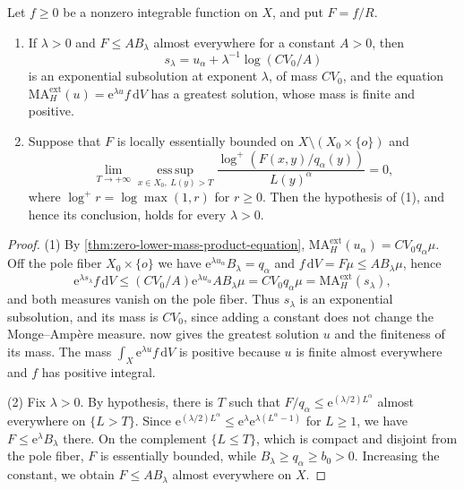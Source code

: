 \begin{theorem}\label{thm:product-zero-threshold-exponential-criterion}
Let $f\geq0$ be a nonzero integrable function on $X$, and put $F=f/R$.
\begin{enumerate}
\item If $\lambda>0$ and $F\leq AB_\lambda$ almost everywhere for a constant $A>0$, then
\[
 s_\lambda=u_\alpha+\lambda^{-1}\log(CV_0/A)
\]
is an exponential subsolution at exponent $\lambda$, of mass $CV_0$, and the equation $\mathrm{MA}^{\mathrm{ext}}_H(u)=\mathrm{e}^{\lambda u}f\,\mathrm{d}V$ has a greatest solution, whose mass is finite and positive.
\item Suppose that $F$ is locally essentially bounded on $X\setminus(X_0\times\{o\})$ and
\[
 \lim_{T\to+\infty}\operatorname*{ess\,sup}_{x\in X_0,\ L(y)>T}
 \frac{\log^+(F(x,y)/q_\alpha(y))}{L(y)^\alpha}=0,
\]
where $\log^+r=\log\max(1,r)$ for $r\geq0$.
Then the hypothesis of (1), and hence its conclusion, holds for every $\lambda>0$.
\end{enumerate}
\end{theorem}
\begin{proof}
(1) By \cref{thm:zero-lower-mass-product-equation}, $\mathrm{MA}^{\mathrm{ext}}_H(u_\alpha)=CV_0q_\alpha\mu$. Off the pole fiber $X_0\times\{o\}$ we have $\mathrm e^{\lambda u_\alpha}B_\lambda=q_\alpha$ and $f\,\mathrm{d}V=F\mu\leq AB_\lambda\mu$, hence
\[
 \mathrm e^{\lambda s_\lambda}f\,\mathrm dV
 \leq(CV_0/A)\mathrm e^{\lambda u_\alpha}AB_\lambda\mu
 =CV_0q_\alpha\mu=\mathrm{MA}^{\mathrm{ext}}_H(s_\lambda),
\]
and both measures vanish on the pole fiber. Thus $s_\lambda$ is an exponential subsolution, and its mass is $CV_0$, since adding a constant does not change the Monge--Amp\`ere measure.  now gives the greatest solution $u$ and the finiteness of its mass. The mass $\int_X\mathrm{e}^{\lambda u}f\,\mathrm{d}V$ is positive because $u$ is finite almost everywhere and $f$ has positive integral.

(2) Fix $\lambda>0$. By hypothesis, there is $T$ such that $F/q_\alpha\leq\mathrm e^{(\lambda/2)L^\alpha}$ almost everywhere on $\{L>T\}$. Since $\mathrm e^{(\lambda/2)L^\alpha}\leq\mathrm e^{\lambda}\mathrm e^{\lambda(L^\alpha-1)}$ for $L\geq1$, we have $F\leq\mathrm e^{\lambda}B_\lambda$ there. On the complement $\{L\leq T\}$, which is compact and disjoint from the pole fiber, $F$ is essentially bounded, while $B_\lambda\geq q_\alpha\geq b_0>0$. Increasing the constant, we obtain $F\leq AB_\lambda$ almost everywhere on $X$.
\end{proof}

